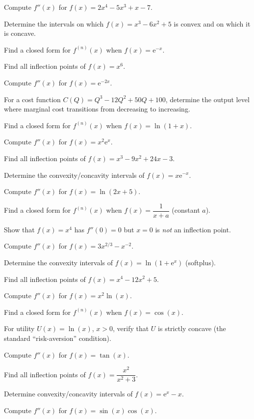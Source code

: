 \begin{problems}
  \item Compute $f''(x)$ for $f(x)=2x^{4}-5x^{3}+x-7$.
  \item Determine the intervals on which $f(x)=x^{3}-6x^{2}+5$ is convex and
        on which it is concave.
  \item Find a closed form for $f^{(n)}(x)$ when $f(x)=\mathrm{e}^{-x}$.
  \item Find all inflection points of $f(x)=x^{6}$.
  \item Compute $f''(x)$ for $f(x)=\mathrm{e}^{-2x}$.
  \item For a cost function $C(Q)=Q^{3}-12Q^{2}+50Q+100$, determine the
        output level where marginal cost transitions from decreasing to
        increasing.
  \item Find a closed form for $f^{(n)}(x)$ when $f(x)=\ln(1+x)$.
  \item Compute $f''(x)$ for $f(x)=x^{2}\mathrm{e}^{x}$.
  \item Find all inflection points of $f(x)=x^{3}-9x^{2}+24x-3$.
  \item Determine the convexity/concavity intervals of $f(x)=x\mathrm{e}^{-x}$.
  \item Compute $f''(x)$ for $f(x)=\ln(2x+5)$.
  \item Find a closed form for $f^{(n)}(x)$ when $f(x)=\dfrac{1}{x+a}$
        (constant $a$).
  \item Show that $f(x)=x^{4}$ has $f''(0)=0$ but $x=0$ is \emph{not} an
        inflection point.
  \item Compute $f''(x)$ for $f(x)=3x^{2/3}-x^{-2}$.
  \item Determine the convexity intervals of $f(x)=\ln(1+\mathrm{e}^{x})$
        (softplus).
  \item Find all inflection points of $f(x)=x^{4}-12x^{2}+5$.
  \item Compute $f''(x)$ for $f(x)=x^{2}\ln(x)$.
  \item Find a closed form for $f^{(n)}(x)$ when $f(x)=\cos(x)$.
  \item For utility $U(x)=\ln(x)$, $x>0$, verify that $U$ is strictly
        concave (the standard ``risk-aversion'' condition).
  \item Compute $f''(x)$ for $f(x)=\tan(x)$.
  \item Find all inflection points of $f(x)=\dfrac{x^{2}}{x^{2}+3}$.
  \item Determine convexity/concavity intervals of $f(x)=\mathrm{e}^{x}-x$.
  \item Compute $f''(x)$ for $f(x)=\sin(x)\cos(x)$.

\end{problems}
